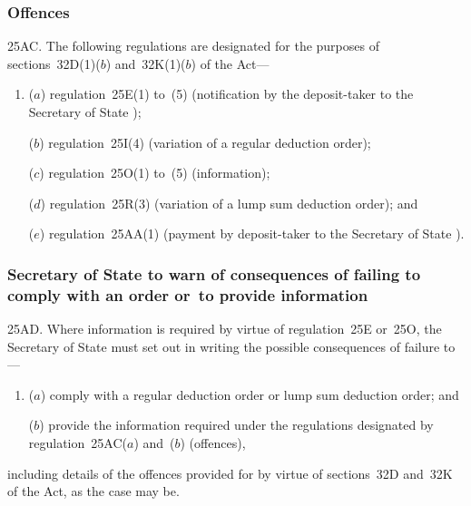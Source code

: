 \documentclass[12pt,a4paper]{article}
\begin{document}
\subsubsection[25AC. Offences]{Offences}

25AC. The following regulations are designated for the purposes of sections~32D(1)($b$)  and~32K(1)($b$)  of the Act—
\begin{enumerate}\item[]
($a$) regulation~25E(1) to~(5) (notification by the deposit-taker to the 
Secretary of State%
);

($b$) regulation~25I(4) (variation of a regular deduction order);

($c$) regulation~25O(1) to~(5) (information);

($d$) regulation~25R(3) (variation of a lump sum deduction order); and

($e$) regulation~25AA(1) (payment by deposit-taker to the 
Secretary of State%
).
\end{enumerate}


\subsubsection[25AD. 
Secretary of State  %
to warn of consequences of failing to comply with an order or~to provide information]{%
Secretary of State  %
to warn of consequences of failing to comply with an order or~to provide information}

25AD.  Where information is required by virtue of regulation~25E or~25O, the 
Secretary of State  %
must set out in writing the possible consequences of failure to—
\begin{enumerate}\item[]
($a$) comply with a regular deduction order or lump sum deduction order; and

($b$) provide the information required under the regulations designated by regulation~25AC($a$)  and~($b$)  (offences),
\end{enumerate}
including details of the offences provided for by virtue of sections~32D and~32K of the   Act, as the case may be.
\end{document}
